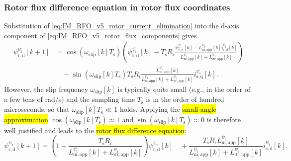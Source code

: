 \begin{frame}
    \frametitle{Rotor flux difference equation in rotor flux coordinates}
    Substitution of \eqref{eq:IM_RFO_v5_rotor_current_elimination} into the $\mathrm{d}$-axis component of \eqref{eq:IM_RFO_v5_rotor_flux_components} gives
    \begin{equation}
        \begin{split}
            \psi^{\psi_\mathrm{r}}_{\mathrm{r,d}}[k+1]
             & =\cos(\omega_\mathrm{slip}[k]T_\mathrm{s})
            \left(\psi^{\psi_\mathrm{r}}_{\mathrm{r,d}}[k]
            -T_\mathrm{s}R_\mathrm{r}
            \frac{\psi^{\psi_\mathrm{r}}_{\mathrm{r,d}}[k]
                -L^{\psi_\mathrm{r}}_{\mathrm{m,app}}[k]i^{\psi_\mathrm{r}}_{\mathrm{s,d}}[k]}
            {L^{\psi_\mathrm{r}}_{\mathrm{m,app}}[k]+L^{\psi_\mathrm{r}}_{\sigma\mathrm{r,app}}[k]}\right) \\
             & \quad-\sin(\omega_\mathrm{slip}[k]T_\mathrm{s})T_\mathrm{s}R_\mathrm{r}
            \frac{L^{\psi_\mathrm{r}}_{\mathrm{m,app}}[k]}
            {L^{\psi_\mathrm{r}}_{\mathrm{m,app}}[k]+L^{\psi_\mathrm{r}}_{\sigma\mathrm{r,app}}[k]}
            i^{\psi_\mathrm{r}}_{\mathrm{s,q}}[k].
        \end{split}\
        \label{eq:IM_RFO_v5_rotor_flux_exact}
    \end{equation}\pause%
    However, the slip frequency $\omega_\mathrm{slip}[k]$ is typically quite small (e.g., in the order of a few tens of rad/s) and the sampling time $T_\mathrm{s}$ is in the order of hundred microseconds, so that $\omega_\mathrm{slip}[k]T_\mathrm{s}\ll 1$ holds. Applying the \hl{small-angle approximation} $\cos(\omega_\mathrm{slip}[k]T_\mathrm{s})\approx1$ and $\sin(\omega_\mathrm{slip}[k]T_\mathrm{s})\approx0$ is therefore well justified and leads to the \hl{rotor flux difference equation}:
    \begin{equation}
        \psi^{\psi_\mathrm{r}}_{\mathrm{r,d}}[k+1]
        =\left(1-\frac{T_\mathrm{s}R_\mathrm{r}}
        {L^{\psi_\mathrm{r}}_{\mathrm{m,app}}[k]+L^{\psi_\mathrm{r}}_{\sigma\mathrm{r,app}}[k]}\right)
        \psi^{\psi_\mathrm{r}}_{\mathrm{r,d}}[k]
        \quad+\frac{T_\mathrm{s}R_\mathrm{r}L^{\psi_\mathrm{r}}_{\mathrm{m,app}}[k]}
        {L^{\psi_\mathrm{r}}_{\mathrm{m,app}}[k]+L^{\psi_\mathrm{r}}_{\sigma\mathrm{r,app}}[k]}
        i^{\psi_\mathrm{r}}_{\mathrm{s,d}}[k].
        \label{eq:IM_RFO_v5_rotor_flux_first_order}
    \end{equation}
\end{frame}

